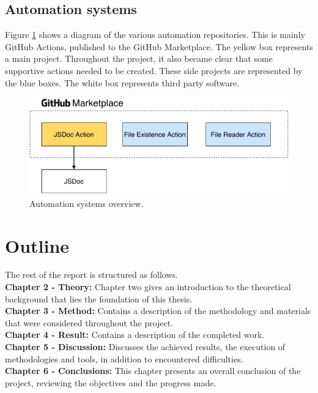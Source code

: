 \subsection{Automation systems}
Figure \ref{fig:automation-systems-overview} shows a diagram of the various automation repositories. This is mainly GitHub Actions, published to the GitHub Marketplace. The yellow box represents a main project. Throughout the project, it also became clear that some supportive actions needed to be created. These side projects are represented by the blue boxes. The white box represents third party software.
\begin{figure}[ht]
    \centering
    \includegraphics[page=1,scale=0.85]{sections/introduction/figures/automation-systems-overview.pdf}
    \caption{Automation systems overview.}
    \label{fig:automation-systems-overview}
\end{figure}

\section{Outline}

The rest of the report is structured as follows.\\
\textbf{Chapter 2 - Theory:} Chapter two gives an introduction to the theoretical background that lies the foundation of this thesis.\\
\textbf{Chapter 3 - Method:} Contains a description of the methodology and materials that were considered throughout the project.\\
\textbf{Chapter 4 - Result:} Contains a description of the completed work.\\
\textbf{Chapter 5 - Discussion:} Discusses the achieved results, the execution of methodologies and tools, in addition to encountered difficulties.\\
\textbf{Chapter 6 - Conclusions:} This chapter presents an overall conclusion of the project, reviewing the objectives and the progress made.